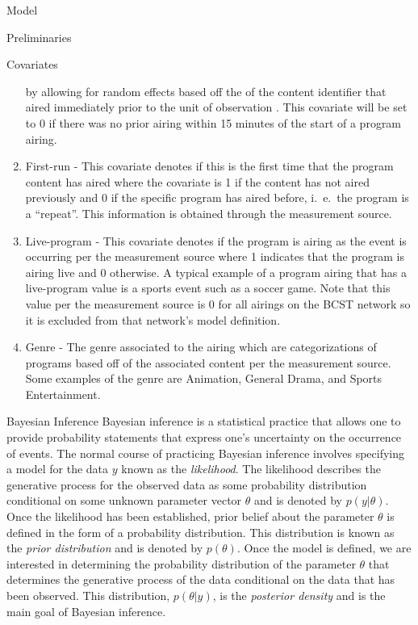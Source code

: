 \begin{chapter}{Model}
\begin{section}{Preliminaries}
\begin{subsection}{Covariates}
\begin{enumerate}
      by allowing for random effects based off the of the content identifier that aired immediately prior to the unit of observation \cite{tvforecasting}.
      This covariate will be set to 0 if there was no prior airing within 15 minutes of the start of a program airing.
    \item First-run - This covariate denotes if this is the first time that the program content has aired where the covariate
      is 1 if the content has not aired previously and 0 if the specific program has aired before, i.\ e.\ the program is a ``repeat''.
      This information is obtained through the measurement source.
    \item Live-program - This covariate denotes if the program is airing as the event is occurring per the measurement source
      where 1 indicates that the program is airing live and 0 otherwise.
      A typical example of a program airing that has a live-program value is a sports event such as a soccer game.
      Note that this value per the measurement source is 0 for all airings on the BCST network so it is excluded from
      that network's model definition.
    \item Genre - The genre associated to the airing which are categorizations
      of programs based off of the associated content per the measurement source.
      Some examples of the genre are Animation, General Drama, and Sports Entertainment.
    \end{enumerate}
  \end{subsection}

  \begin{subsection}{Bayesian Inference}
    Bayesian inference is a statistical practice that allows one to provide probability
    statements that express one's uncertainty on the occurrence of events.
    The normal course of practicing Bayesian inference involves specifying a model for the data $y$ known
    as the \emph{likelihood}. The likelihood describes the generative process for the observed data
    as some probability distribution conditional on some unknown parameter vector $\theta$ and is denoted
    by $p(y | \theta)$. Once the likelihood has been established, prior belief about the parameter $\theta$
    is defined in the form of a probability distribution. This distribution is known as the
    \emph{prior distribution} and is denoted by $p(\theta)$. Once the model is defined,
    we are interested in determining the probability distribution of the parameter $\theta$
    that determines the generative process of the data
    conditional on the data that has been observed. This distribution, $p(\theta | y)$,
    is the \emph{posterior density} and is the main goal of Bayesian inference.


\end{subsection}
\end{section}
\end{chapter}

